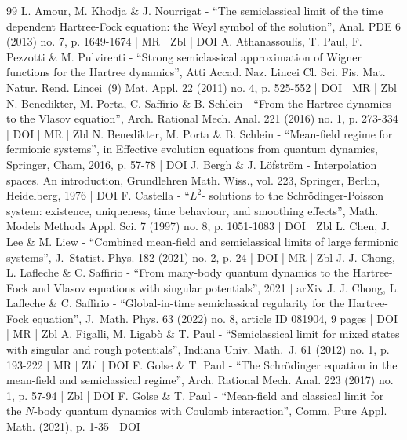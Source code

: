 \begin{thebibliography}{99}
L. Amour, M. Khodja \& J. Nourrigat - “The semiclassical limit of the time dependent Hartree-Fock equation: the Weyl symbol of the solution”, Anal. PDE 6 (2013) no. 7, p. 1649-1674 | MR | Zbl | DOI
A. Athanassoulis, T. Paul, F. Pezzotti \& M. Pulvirenti - “Strong semiclassical approximation of Wigner functions for the Hartree dynamics”, Atti Accad. Naz. Lincei Cl. Sci. Fis. Mat. Natur. Rend. Lincei (9) Mat. Appl. 22 (2011) no. 4, p. 525-552 | DOI | MR | Zbl
N. Benedikter, M. Porta, C. Saffirio \& B. Schlein - “From the Hartree dynamics to the Vlasov equation”, Arch. Rational Mech. Anal. 221 (2016) no. 1, p. 273-334 | DOI | MR | Zbl
N. Benedikter, M. Porta \& B. Schlein - “Mean-field regime for fermionic systems”, in Effective evolution equations from quantum dynamics, Springer, Cham, 2016, p. 57-78 | DOI
J. Bergh \& J. Löfström - Interpolation spaces. An introduction, Grundlehren Math. Wiss., vol. 223, Springer, Berlin, Heidelberg, 1976 | DOI
F. Castella - “$L^2$- solutions to the Schrödinger-Poisson system: existence, uniqueness, time behaviour, and smoothing effects”, Math. Models Methods Appl. Sci. 7 (1997) no. 8, p. 1051-1083 | DOI | Zbl
L. Chen, J. Lee \& M. Liew - “Combined mean-field and semiclassical limits of large fermionic systems”, J. Statist. Phys. 182 (2021) no. 2, p. 24 | DOI | MR | Zbl
J. J. Chong, L. Lafleche \& C. Saffirio - “From many-body quantum dynamics to the Hartree-Fock and Vlasov equations with singular potentials”, 2021 | arXiv
J. J. Chong, L. Lafleche \& C. Saffirio - “Global-in-time semiclassical regularity for the Hartree-Fock equation”, J. Math. Phys. 63 (2022) no. 8, article ID 081904, 9 pages | DOI | MR | Zbl
A. Figalli, M. Ligabò \& T. Paul - “Semiclassical limit for mixed states with singular and rough potentials”, Indiana Univ. Math. J. 61 (2012) no. 1, p. 193-222 | MR | Zbl | DOI
F. Golse \& T. Paul - “The Schrödinger equation in the mean-field and semiclassical regime”, Arch. Rational Mech. Anal. 223 (2017) no. 1, p. 57-94 | Zbl | DOI
F. Golse \& T. Paul - “Mean-field and classical limit for the $N$-body quantum dynamics with Coulomb interaction”, Comm. Pure Appl. Math. (2021), p. 1-35 | DOI

\end{thebibliography}
